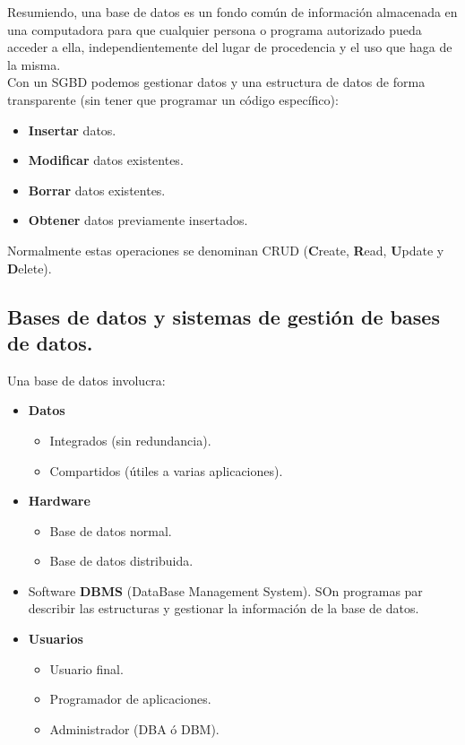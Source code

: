 \documentclass[12pt,spanish]{article}
\numberwithin{definition}{subsection}
\begin{document}
Resumiendo, una base de datos es un fondo común de información almacenada en una computadora para que cualquier persona o programa autorizado pueda acceder a ella, independientemente del lugar de procedencia  y el uso que haga de la misma.\\

Con un SGBD podemos gestionar datos y una estructura de datos de forma transparente (sin tener que programar un código específico):
	\begin{itemize}
		\item \textbf{Insertar} datos.
		\item \textbf{Modificar} datos existentes.
		\item \textbf{Borrar} datos existentes.
		\item \textbf{Obtener} datos previamente insertados.
	\end{itemize}
Normalmente estas operaciones se denominan CRUD (\textbf{C}reate, \textbf{R}ead, \textbf{U}pdate y \textbf{D}elete).


\subsection{Bases de datos y sistemas de gestión de bases de datos.}

Una base de datos involucra:

\begin{itemize}
	\item \textbf{Datos}
		\begin{itemize}
			\item Integrados (sin redundancia).
			\item Compartidos (útiles a varias aplicaciones).
		\end{itemize}
		\item \textbf{Hardware}
			\begin{itemize}
				\item Base de datos normal.
				\item Base de datos distribuida.
			\end{itemize}
		\item Software \textbf{DBMS} (DataBase Management System). SOn programas par describir las estructuras y gestionar la información de la base de datos.
		\item \textbf{Usuarios}
			\begin{itemize}
				\item Usuario final.
				\item Programador de aplicaciones.
				\item Administrador (DBA ó DBM).
			\end{itemize}
\end{itemize}
\end{document}
